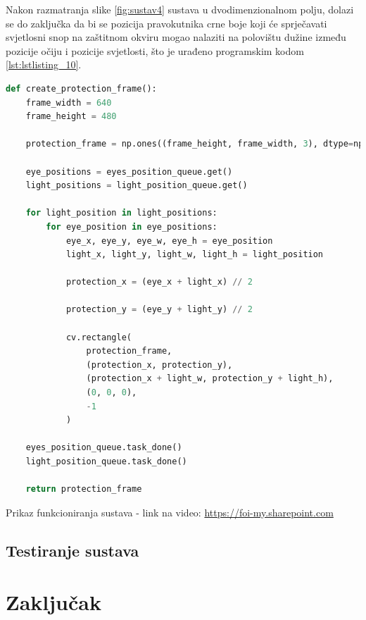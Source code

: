 \documentclass{foi}
\begin{document}
\newpage
Nakon razmatranja slike \ref{fig:sustav4} sustava u dvodimenzionalnom polju, dolazi se do zaključka da bi se pozicija pravokutnika crne boje koji će sprječavati svjetlosni snop na zaštitnom okviru mogao nalaziti na polovištu dužine između pozicije očiju i pozicije svjetlosti, što je urađeno programskim kodom \ref{lst:lstlisting_10}.

\begin{lstlisting}[language=Python, label={lst:lstlisting_10}, firstnumber=33, style=colored, caption={Definicija funkcije $create\_protection\_frame()$}]
def create_protection_frame():
    frame_width = 640
    frame_height = 480

    protection_frame = np.ones((frame_height, frame_width, 3), dtype=np.uint8) * 255

    eye_positions = eyes_position_queue.get()
    light_positions = light_position_queue.get()

    for light_position in light_positions:
        for eye_position in eye_positions:
            eye_x, eye_y, eye_w, eye_h = eye_position
            light_x, light_y, light_w, light_h = light_position

            protection_x = (eye_x + light_x) // 2

            protection_y = (eye_y + light_y) // 2

            cv.rectangle(
                protection_frame,
                (protection_x, protection_y),
                (protection_x + light_w, protection_y + light_h),
                (0, 0, 0),
                -1
            )

    eyes_position_queue.task_done()
    light_position_queue.task_done()

    return protection_frame
\end{lstlisting}

Prikaz funkcioniranja sustava - link na video: \href{https://foi-my.sharepoint.com/:v:/g/personal/spetrovic20_foi_hr/ERfsxYop3VFCnwyEWHfwgokB6hWikBInY5lpKwYVjjt91A?nav=eyJyZWZlcnJhbEluZm8iOnsicmVmZXJyYWxBcHAiOiJPbmVEcml2ZUZvckJ1c2luZXNzIiwicmVmZXJyYWxBcHBQbGF0Zm9ybSI6IldlYiIsInJlZmVycmFsTW9kZSI6InZpZXciLCJyZWZlcnJhbFZpZXciOiJNeUZpbGVzTGlua0RpcmVjdCJ9fQ&e=REgtGV}{https://foi-my.sharepoint.com}

\section{Testiranje sustava}

\pagebreak
\chapter{Zaključak}
\end{document}
